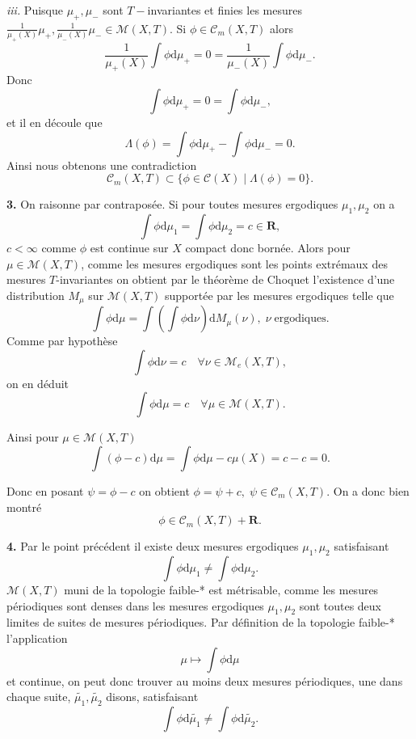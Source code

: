 \documentclass[12pt]{article}
\newcommand{\R}{\mathbf{R}}
\newcommand{\de}{\mathrm{d}}
\begin{document}
\medskip

\textit{iii.} Puisque $\mu_{+}, \mu_{-}$ sont $T-$invariantes et finies les mesures $\frac{1}{\mu_{+}(X)}\mu_{+}, \frac{1}{\mu_{-}(X)}\mu_{-} \in \mathcal{M}(X,T)$. Si $\phi \in \mathcal{C}_{m}(X,T)$ alors \[
        \frac{1}{\mu_{+}(X)}\int\phi\de\mu_{+} = 0 = \frac{1}{\mu_{-}(X)}\int\phi\de\mu_{-}
.\] Donc \[
\int\phi\de\mu_{+} = 0 = \int\phi\de\mu_{-}
,\] et il en découle que \[
\Lambda(\phi) = \int\phi\de\mu_{+} - \int\phi\de\mu_{-} = 0
.\]  
Ainsi nous obtenons une contradiction \[
        \mathcal{C}_{m}(X,T) \subset \{\phi \in \mathcal{C}(X) \;|\; \Lambda(\phi) = 0\} 
.\] 

\bigskip

\textbf{3.} On raisonne par contraposée. Si pour toutes mesures ergodiques $\mu_1, \mu_2$ on a \[
        \int\phi\de\mu_1 = \int\phi\de\mu_2 = c \in \R
,\] $c < \infty$ comme $\phi$ est continue sur $X$ compact donc bornée. Alors pour $\mu \in \mathcal{M}(X,T)$, comme les mesures ergodiques sont les points extrémaux des mesures  $T$-invariantes on obtient par le théorème de Choquet l'existence d'une distribution $M_{\mu}$ sur $\mathcal{M}(X,T)$ supportée par les mesures ergodiques telle que \[
\int\phi\de\mu = \int(\int\phi\de\nu)\de M_{\mu}(\nu), \; \nu \; \text{ergodiques}
.\]  
Comme par hypothèse  \[
        \int\phi\de\nu = c \quad \forall \nu \in \mathcal{M}_{e}(X,T)
,\] on en déduit \[
\int\phi\de\mu = c \quad \forall \mu \in \mathcal{M}(X,T)
.\] 

Ainsi pour $\mu \in \mathcal{M}(X,T)$ \[
        \int(\phi - c)\de\mu = \int\phi\de\mu - c\mu(X) = c - c = 0
.\] 

Donc en posant $\psi = \phi - c$ on obtient $\phi = \psi + c, \; \psi \in \mathcal{C}_{m}(X,T)$. On a donc bien montré \[
        \phi \in \mathcal{C}_{m}(X,T) + \R
.\]  

\bigskip

\textbf{4.} Par le point précédent il existe deux mesures ergodiques $\mu_1, \mu_2$ satisfaisant \[
\int\phi\de\mu_1 \neq \int\phi\de\mu_2
.\] $\mathcal{M}(X,T)$ muni de la topologie faible-* est métrisable, comme les mesures périodiques sont denses dans les mesures ergodiques $\mu_1, \mu_2$ sont toutes deux limites de suites de mesures périodiques. Par définition de la topologie faible-* l'application \[
\mu \longmapsto \int\phi\de\mu
\] et continue, on peut donc trouver au moins deux mesures périodiques, une dans chaque suite, $\tilde{\mu_1}, \tilde{\mu_2}$ disons, satisfaisant \[
\int\phi\de\tilde{\mu_1} \neq \int\phi\de\tilde{\mu_2}
.\]  
\end{document}
